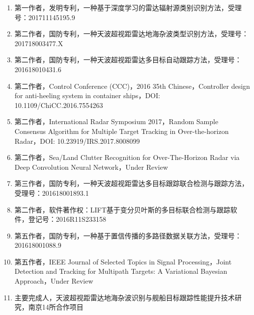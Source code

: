 \begin{enumerate}
\item 第一作者，发明专利，一种基于深度学习的雷达辐射源类别识别方法，受理号：201711145195.9
\item 第二作者，国防专利，一种天波超视距雷达地海杂波类型识别方法，受理号：201718003477.X

\item 第二作者，国防专利，一种天波超视距雷达多目标自动跟踪方法，受理号：201618010431.6

\item 第二作者，Control Conference (CCC)，2016 35th Chinese，Controller design for anti-heeling system in container ships，DOI: 10.1109/ChiCC.2016.7554263

\item 第二作者，International Radar Symposium 2017，Random Sample Consensus Algorithm for Multiple Target Tracking in Over-the-horizon Radar，DOI: 10.23919/IRS.2017.8008099

\item 第二作者，Sea/Land Clutter Recognition for Over-The-Horizon Radar via Deep Convolution Neural Network，Under Review

\item 第三作者，国防专利，一种天波超视距雷达多目标跟踪联合检测与跟踪方法，受理号：201618001893.1

\item 第二作者，软件著作权：LIFT\underline{\hspace{0.5em}}基于变分贝叶斯的多目标联合检测与跟踪软件，登记号：2016R11S233158

\item 第五作者，国防专利，一种基于置信传播的多路径数据关联方法，受理号：201618001088.9

\item 第五作者，IEEE Journal of Selected Topics in Signal Processing，Joint Detection and Tracking for Multipath Targets: A Variational Bayesian Approach，Under Review

\item 主要完成人，天波超视距雷达地海杂波识别与舰船目标跟踪性能提升技术研究，南京14所合作项目

\end{enumerate}

